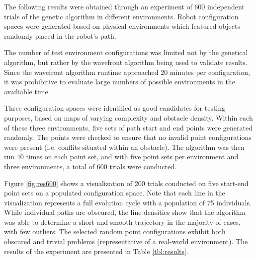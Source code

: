 %
The following results were obtained through an experiment of 600 independent trials of the genetic algorithm in different environments. Robot configuration spaces were generated based on physical environments which featured objects randomly placed in the robot's path.

The number of test environment configurations was limited not by the genetical algorithm, but rather by the wavefront algorithm being used to validate results. Since the wavefront algorithm runtime approached 20 minutes per configuration, it was prohibitive to evaluate large numbers of possible environments in the availiable time.

Three configuration spaces were identified as good candidates for testing purposes, based on maps of varying complexity and obstacle density. Within each of these three environments, five sets of path start and end points were generated randomly. The points were checked to ensure that no invalid point configurations were present (i.e. conflits situated within an obstacle). The algorithm was then run 40 times on each point set, and with five point sets per environment and three environments, a total of 600 trials were conducted.

Figure \ref{fig:res600} shows a visualization of 200 trials conducted on five start-end point sets on a populated configuration space. Note that each line in the visualization represents a full evolution cycle with a population of 75 individuals. While individual paths are obscured, the line densities show that the algorithm was able to determine a short and smooth trajectory in the majority of cases, with few outliers. The selected random point configurations exhibit both obscured and trivial problems (representative of a real-world environment). The results of the experiment are presented in Table \ref{tbl:results}.


